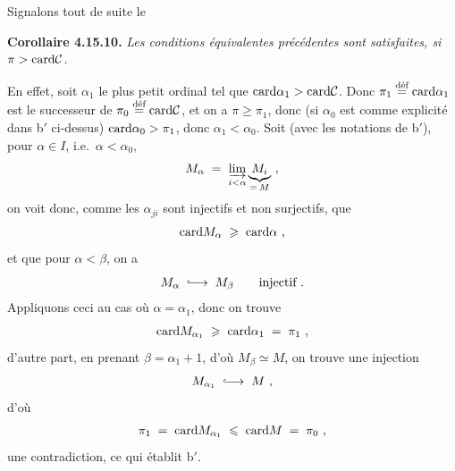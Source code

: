 
Signalons tout de suite le

\textbf{Corollaire 4.15.10.} \textit{Les conditions équivalentes précédentes sont satisfaites, si $\pi > \card\mathcal{C}$.}

En effet, soit $\alpha_1$ le plus petit ordinal tel que $\card\alpha_1 > \card\mathcal{C}$. Donc $\pi_1 \defeq \card\alpha_1$ est le successeur de $\pi_0 \defeq \card\mathcal{C}$, et on a $\pi \geqslant \pi_1$, donc (si $\alpha_0$ est comme explicité dans b$'$ ci-dessus) $\card\alpha_0 > \pi_1$, donc $\alpha_1 < \alpha_0$. Soit (avec les notations de b$'$), pour $\alpha \in I$, i.e.\ $\alpha < \alpha_0$,
\[
M_\alpha \;=\; \varinjlim_{i<\alpha} \underbrace{M_i}_{=\,M}\ ,
\]
on voit donc, comme les $\alpha_{ji}$ sont injectifs et non surjectifs, que
\[
\card M_\alpha \;\geqslant\; \card\alpha\ ,
\]
et que pour $\alpha < \beta$, on a
\[
M_\alpha \;\into\; M_\beta \qquad \text{injectif}\ .
\]
Appliquons ceci au cas où $\alpha = \alpha_1$, donc on trouve
\[
\card M_{\alpha_1} \;\geqslant\; \card\alpha_1 \;=\; \pi_1\ ,
\]
d'autre part, en prenant $\beta = \alpha_1 + 1$, d'où $M_\beta \simeq M$, on trouve une injection
\[
M_{\alpha_1} \;\into\; M\ ,
\]
d'où
\[
\pi_1 \;=\; \card M_{\alpha_1} \;\leqslant\; \card M \;=\; \pi_0\ ,
\]
une contradiction, ce qui établit b$'$.

